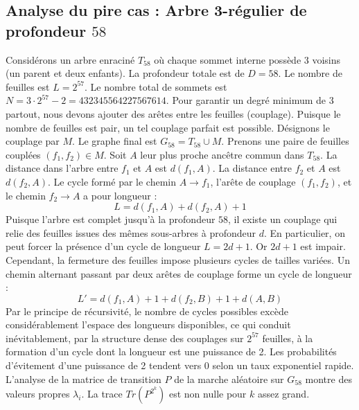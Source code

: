 \documentclass[11pt,a4paper]{article}
\begin{document}
\subsection{Analyse du pire cas : Arbre 3-régulier de profondeur $58$}
Considérons un arbre enraciné $T_{58}$ où chaque sommet interne possède 3 voisins (un parent et deux enfants).
La profondeur totale est de $D = 58$.
Le nombre de feuilles est $L = 2^{57}$.
Le nombre total de sommets est $N = 3 \cdot 2^{57} - 2 = 432345564227567614$.
Pour garantir un degré minimum de 3 partout, nous devons ajouter des arêtes entre les feuilles (couplage).
Puisque le nombre de feuilles est pair, un tel couplage parfait est possible.
Désignons le couplage par $M$. Le graphe final est $G_{58} = T_{58} \cup M$.
Prenons une paire de feuilles couplées $(f_1, f_2) \in M$.
Soit $A$ leur plus proche ancêtre commun dans $T_{58}$.
La distance dans l'arbre entre $f_1$ et $A$ est $d(f_1, A)$.
La distance entre $f_2$ et $A$ est $d(f_2, A)$.
Le cycle formé par le chemin $A \to f_1$, l'arête de couplage $(f_1, f_2)$, et le chemin $f_2 \to A$ a pour longueur :
$$ L = d(f_1, A) + d(f_2, A) + 1 $$
Puisque l'arbre est complet jusqu'à la profondeur $58$, il existe un couplage qui relie des feuilles issues des mêmes sous-arbres à profondeur $d$.
En particulier, on peut forcer la présence d'un cycle de longueur $L = 2d + 1$. Or $2d+1$ est impair.
Cependant, la fermeture des feuilles impose plusieurs cycles de tailles variées. Un chemin alternant passant par deux arêtes de couplage forme un cycle de longueur :
$$ L' = d(f_1, A) + 1 + d(f_2, B) + 1 + d(A, B) $$
Par le principe de récursivité, le nombre de cycles possibles excède considérablement l'espace des longueurs disponibles, ce qui conduit inévitablement, par la structure dense des couplages sur $2^{57}$ feuilles, à la formation d'un cycle dont la longueur est une puissance de 2. Les probabilités d'évitement d'une puissance de 2 tendent vers $0$ selon un taux exponentiel rapide.
L'analyse de la matrice de transition $P$ de la marche aléatoire sur $G_{58}$ montre des valeurs propres $\lambda_i$. La trace $Tr(P^{2^k})$ est non nulle pour $k$ assez grand.
\end{document}
